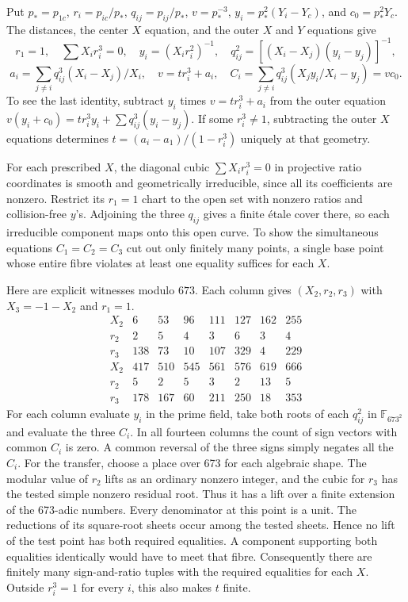 \documentclass[11pt,letterpaper]{article}
\theoremstyle{definition}
\begin{document}
Put $p_*=p_{1c}$, $r_i=p_{ic}/p_*$, $q_{ij}=p_{ij}/p_*$, $v=p_*^{-3}$, $y_i=p_*^2(Y_i-Y_c)$, and $c_0=p_*^2Y_c$. The distances, the center $X$ equation, and the outer $X$ and $Y$ equations give
\[
r_1=1,\quad \sum X_i r_i^3=0,\quad y_i=(X_i r_i^2)^{-1},\quad
q_{ij}^2=[(X_i-X_j)(y_i-y_j)]^{-1},
\]
\[
a_i=\sum_{j\ne i}q_{ij}^3(X_i-X_j)/X_i,\quad
v=t r_i^3+a_i,\quad
C_i=\sum_{j\ne i}q_{ij}^3(X_jy_i/X_i-y_j)=v c_0 .
\]
To see the last identity, subtract $y_i$ times $v=t r_i^3+a_i$ from the outer equation $v(y_i+c_0)=t r_i^3y_i+\sum q_{ij}^3(y_i-y_j)$. If some $r_i^3\ne1$, subtracting the outer $X$ equations determines $t=(a_i-a_1)/(1-r_i^3)$ uniquely at that geometry.

For each prescribed $X$, the diagonal cubic $\sum X_i r_i^3=0$ in projective ratio coordinates is smooth and geometrically irreducible, since all its coefficients are nonzero. Restrict its $r_1=1$ chart to the open set with nonzero ratios and collision-free $y$'s. Adjoining the three $q_{ij}$ gives a finite étale cover there, so each irreducible component maps onto this open curve. To show the simultaneous equations $C_1=C_2=C_3$ cut out only finitely many points, a single base point whose entire fibre violates at least one equality suffices for each $X$.

Here are explicit witnesses modulo $673$. Each column gives $(X_2,r_2,r_3)$ with $X_3=-1-X_2$ and $r_1=1$.
\[
\begin{array}{r|rrrrrrr}
X_2&6&53&96&111&127&162&255\\ r_2&2&5&4&3&6&3&4\\ r_3&138&73&10&107&329&4&229\\ \hline
X_2&417&510&545&561&576&619&666\\ r_2&5&2&5&3&2&13&5\\ r_3&178&167&60&211&250&18&353
\end{array}
\]
For each column evaluate $y_i$ in the prime field, take both roots of
each $q_{ij}^2$ in $\mathbb F_{673^2}$ and evaluate the three $C_i$.
In all fourteen columns the count of sign vectors with common $C_i$ is
zero. A common reversal of the three signs simply negates all the $C_i$. For the transfer, choose a place over 673 for each algebraic shape. The modular value of $r_2$ lifts as an ordinary nonzero integer, and the cubic for $r_3$ has the tested simple nonzero residual root. Thus it has a lift over a finite extension of the 673-adic numbers. Every denominator at this point is a unit. The reductions of its square-root sheets occur among the tested sheets. Hence no lift of the test point has both required equalities. A component supporting both equalities identically would have to meet that fibre. Consequently there are finitely many sign-and-ratio tuples with the required equalities for each $X$. Outside $r_i^3=1$ for every $i$, this also makes $t$ finite.
\end{document}
